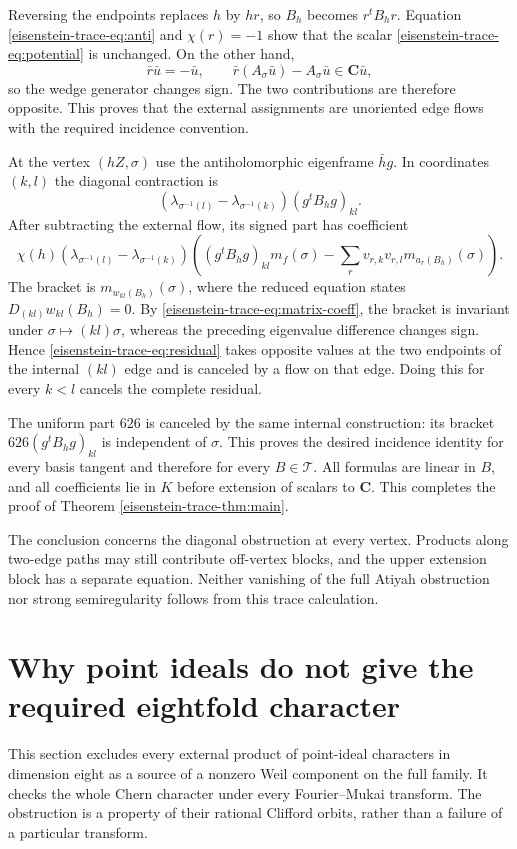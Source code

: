 \documentclass[11pt]{article}
\theoremstyle{definition}
\theoremstyle{remark}
\newcommand{\C}{\mathbf C}
\begin{document}
Reversing the endpoints replaces $h$ by $hr$, so
$B_h$ becomes $r^tB_hr$.  Equation \eqref{eisenstein-trace-eq:anti} and
$\chi(r)=-1$ show that the scalar \eqref{eisenstein-trace-eq:potential} is unchanged.
On the other hand,
\[
 \bar r\bar u=-\bar u,\qquad
 \bar r(A_\sigma\bar u)-A_\sigma\bar u\in\C\bar u,
\]
so the wedge generator changes sign.  The two contributions are
therefore opposite.  This proves that the external assignments are
unoriented edge flows with the required incidence convention.

At the vertex $(hZ,\sigma)$ use the antiholomorphic eigenframe
$\bar h g$.  In coordinates $(k,l)$ the diagonal contraction is
\[
 (\lambda_{\sigma^{-1}(l)}-\lambda_{\sigma^{-1}(k)})
       (g^tB_hg)_{kl}.
\]
After subtracting the external flow, its signed part has coefficient
\begin{equation}\label{eisenstein-trace-eq:residual}
 \chi(h)(\lambda_{\sigma^{-1}(l)}-\lambda_{\sigma^{-1}(k)})
 \left((g^tB_hg)_{kl}m_f(\sigma)
       -\sum_r v_{r,k}v_{r,l}m_{a_r(B_h)}(\sigma)\right).
\end{equation}
The bracket is $m_{w_{kl}(B_h)}(\sigma)$, where the reduced equation
states $D_{(kl)}w_{kl}(B_h)=0$.  By \eqref{eisenstein-trace-eq:matrix-coeff}, the
bracket is invariant under $\sigma\mapsto(kl)\sigma$, whereas the
preceding eigenvalue difference changes sign.  Hence
\eqref{eisenstein-trace-eq:residual} takes opposite values at the two endpoints of
the internal $(kl)$ edge and is canceled by a flow on that edge.
Doing this for every $k<l$ cancels the complete residual.

The uniform part $626$ is canceled by the same internal construction:
its bracket $626(g^tB_hg)_{kl}$ is independent of $\sigma$.
This proves the desired incidence identity for every basis tangent
and therefore for every $B\in\mathcal T$.  All formulas are linear
in $B$, and all coefficients lie in $K$ before extension of scalars
to $\C$.  This completes the proof of Theorem \ref{eisenstein-trace-thm:main}.


The conclusion concerns the diagonal obstruction at every vertex.
Products along two-edge paths may still contribute off-vertex blocks,
and the upper extension block has a separate equation.  Neither
vanishing of the full Atiyah obstruction nor strong semiregularity
follows from this trace calculation.

\section{Why point ideals do not give the required eightfold character}
\label{sec:spin-obstructions}
This section excludes every external product of point-ideal characters in dimension eight as a source of a nonzero Weil component on the full family. It checks the whole Chern character under every Fourier--Mukai transform. The obstruction is a property of their rational Clifford orbits, rather than a failure of a particular transform.
\end{document}
